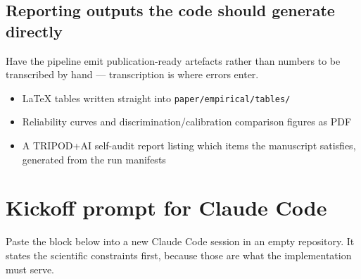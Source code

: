 \documentclass[11pt,a4paper]{article}
\begin{document}
\subsection{Reporting outputs the code should generate directly}

Have the pipeline emit publication-ready artefacts rather than numbers to be
transcribed by hand --- transcription is where errors enter.

\begin{itemize}
  \item LaTeX tables written straight into \texttt{paper/empirical/tables/}
  \item Reliability curves and discrimination/calibration comparison figures
        as PDF
  \item A TRIPOD+AI self-audit report listing which items the manuscript
        satisfies, generated from the run manifests
\end{itemize}

\section{Kickoff prompt for Claude Code}

Paste the block below into a new Claude Code session in an empty repository.
It states the scientific constraints first, because those are what the
implementation must serve.
\end{document}
